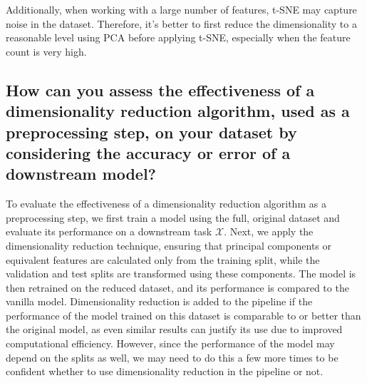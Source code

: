 \documentclass{article}
\begin{document}
Additionally, when working with a large number of features, t-SNE may capture noise in the dataset. Therefore, it's better to first reduce the dimensionality to a reasonable level using PCA before applying t-SNE, especially when the feature count is very high.

\subsection{How can you assess the effectiveness of a dimensionality reduction algorithm, used as a preprocessing step, on your dataset by considering the accuracy or error of a downstream model?}

To evaluate the effectiveness of a dimensionality reduction algorithm as a preprocessing step, we first train a model using the full, original dataset and evaluate its performance on a downstream task $\mathcal{X}$. Next, we apply the dimensionality reduction technique, ensuring that principal components or equivalent features are calculated only from the training split, while the validation and test splits are transformed using these components. The model is then retrained on the reduced dataset, and its performance is compared to the vanilla model. Dimensionality reduction is added to the pipeline if the performance of the model trained on this dataset is comparable to or better than the original model, as even similar results can justify its use due to improved computational efficiency. However, since the performance of the model may depend on the splits as well, we may need to do this a few more times to be confident whether to use dimensionality reduction in the pipeline or not.

\clearpage

% 
% 

\end{document}
